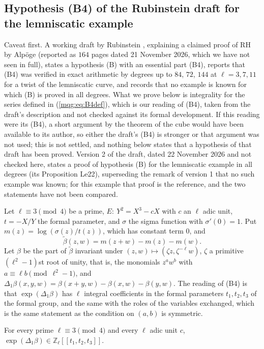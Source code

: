 \subsection{Hypothesis (B4) of the Rubinstein draft for the lemniscatic example}\label{mqg:sec:B4}

Caveat first. A working draft by Rubinstein \cite{Rub26}, explaining a claimed proof of RH by Alp\"oge (reported as $164$ pages dated 21 November 2026, which we have not seen in full), states a hypothesis (B) with an essential part (B4), reports that (B4) was verified in exact arithmetic by degrees up to $84$, $72$, $144$ at $\ell=3,7,11$ for a twist of the lemniscatic curve, and records that no example is known for which (B) is proved in all degrees. What we prove below is integrality for the series defined in (\ref{mqg:eq:B4def}), which is our reading of (B4), taken from the draft's description and not checked against its formal development. If this reading were its (B4), a short argument by the theorem of the cube would have been available to its author, so either the draft's (B4) is stronger or that argument was not used; this is not settled, and nothing below states that a hypothesis of that draft has been proved. Version 2 of the draft, dated 22 November 2026 and not checked here, states a proof of hypothesis (B) for the lemniscatic example in all degrees (its Proposition Le22), superseding the remark of version 1 that no such example was known; for this example that proof is the reference, and the two statements have not been compared.

Let $\ell\equiv3\pmod4$ be a prime, $E:\ Y^2=X^3-cX$ with $c$ an $\ell$ adic unit, $t=-X/Y$ the formal parameter, and $\sigma$ the sigma function with $\sigma'(0)=1$. Put $m(z)=\log(\sigma(z)/t(z))$, which has constant term $0$, and
\begin{equation}\label{mqg:eq:B4def}
\tilde\beta(z,w)=m(z+w)-m(z)-m(w).
\end{equation}
Let $\beta$ be the part of $\tilde\beta$ invariant under $(z,w)\mapsto(\zeta z,\zeta^{-\ell}w)$, $\zeta$ a primitive $(\ell^2-1)$st root of unity, that is, the monomials $z^aw^b$ with $a\equiv\ell b\pmod{\ell^2-1}$, and $\Delta_1\beta(x,y,w)=\beta(x+y,w)-\beta(x,w)-\beta(y,w)$. The reading of (B4) is that $\exp(\Delta_1\beta)$ has $\ell$ integral coefficients in the formal parameters $t_1,t_2,t_3$ of the formal group, and the same with the roles of the variables exchanged, which is the same statement as the condition on $(a,b)$ is symmetric.

\begin{theorem}\label{mqg:thm:B4}
For every prime $\ell\equiv3\pmod4$ and every $\ell$ adic unit $c$, $\exp(\Delta_1\beta)\in\mathbb Z_\ell[[t_1,t_2,t_3]]$.
\end{theorem}

